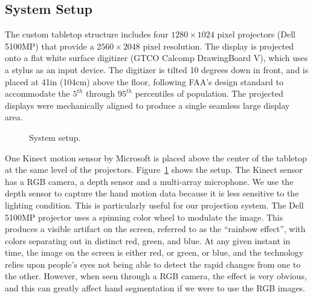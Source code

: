 \subsection{System Setup}
The custom tabletop structure includes four $1280\times1024$ pixel projectors 
(Dell 5100MP) that provide a $2560\times2048$ pixel resolution. The
display is projected onto a flat white surface digitizer (GTCO Calcomp DrawingBoard V), 
which uses a stylus as an input device. The digitizer is tilted 10 degrees down 
in front, and is placed at 41in (104cm) above the floor, following FAA's design 
standard to accommodate the $5^{th}$ through $95^{th}$ percentiles of 
population. The projected displays were mechanically aligned to produce a single 
seamless large display area.

\begin{figure}
  \centering
  \caption{System setup.} \label{fig:setup}
\end{figure}

One Kinect motion sensor by Microsoft is placed above the center of the tabletop
at the same level of the projectors. Figure~\ref{fig:setup} shows the setup. The
Kinect sensor has a RGB camera, a depth sensor and a multi-array microphone.
We use the depth sensor to capture the hand motion data because it is
less sensitive to the lighting condition. This is particularly useful for our
projection system. The Dell 5100MP projector uses a spinning color wheel to
modulate the image. This produces a visible artifact on the screen, referred to 
as the ``rainbow effect'', with colors separating out in distinct red, green, 
and blue. At any given instant in time, the image on the screen is either red, or green, or blue,
and the technology relies upon people's eyes not being able to detect the rapid 
changes from one to the other. However, when seen through a RGB camera, the
effect is very obvious, and this can greatly affect hand segmentation if we were to use 
the RGB images. 

